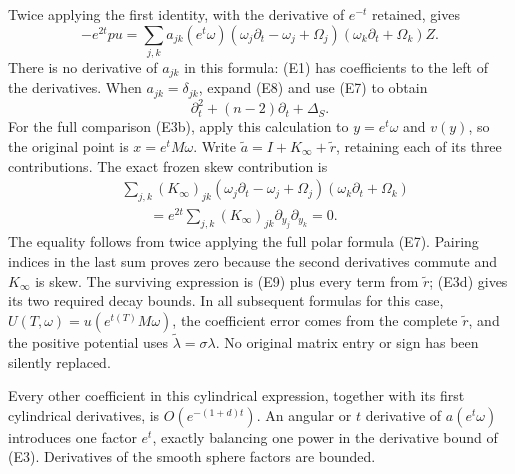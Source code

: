 \documentclass[
  11pt,
]{article}
\begin{document}
Twice applying the first identity, with the derivative of \(e^{-t}\)
retained, gives \[
 -e^{2t}pu=
 \sum_{j,k}a_{jk}(e^t\omega)
 (\omega_j\partial_t-\omega_j+\Omega_j)
 (\omega_k\partial_t+\Omega_k)Z.                                \tag{E8}
\] There is no derivative of \(a_{jk}\) in this formula: (E1) has
coefficients to the left of the derivatives. When
\(a_{jk}=\delta_{jk}\), expand (E8) and use (E7) to obtain \[
 \partial_t^2+(n-2)\partial_t+\Delta_S.                          \tag{E9}
\] For the full comparison (E3b), apply this calculation to
\(y=e^t\omega\) and \(v(y)\), so the original point is \(x=e^tM\omega\).
Write \(\widetilde a=I+K_\infty+\widetilde r\), retaining each of its
three contributions. The exact frozen skew contribution is \[
 \begin{split}
 &\sum_{j,k}(K_\infty)_{jk}
 (\omega_j\partial_t-\omega_j+\Omega_j)
 (\omega_k\partial_t+\Omega_k)\\
 &\qquad=e^{2t}\sum_{j,k}(K_\infty)_{jk}
                    \partial_{y_j}\partial_{y_k}=0.
 \end{split}                                                      \tag{E8a}
\] The equality follows from twice applying the full polar formula (E7).
Pairing indices in the last sum proves zero because the second
derivatives commute and \(K_\infty\) is skew. The surviving expression
is (E9) plus every term from \(\widetilde r\); (E3d) gives its two
required decay bounds. In all subsequent formulas for this case,
\(U(T,\omega)=u(e^{t(T)}M\omega)\), the coefficient error comes from the
complete \(\widetilde r\), and the positive potential uses
\(\widetilde\lambda=\sigma\lambda\). No original matrix entry or sign
has been silently replaced.

Every other coefficient in this cylindrical expression, together with
its first cylindrical derivatives, is \(O(e^{-(1+d)t})\). An angular or
\(t\) derivative of \(a(e^t\omega)\) introduces one factor \(e^t\),
exactly balancing one power in the derivative bound of (E3). Derivatives
of the smooth sphere factors are bounded.
\end{document}
